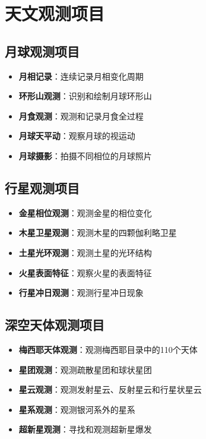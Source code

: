\documentclass[12pt,UTF8]{ctexbook}
\begin{document}
\chapter{天文观测项目}
\section{月球观测项目}

\begin{itemize}
  \item \textbf{月相记录}：连续记录月相变化周期
  \item \textbf{环形山观测}：识别和绘制月球环形山
  \item \textbf{月食观测}：观测和记录月食全过程
  \item \textbf{月球天平动}：观察月球的视运动
  \item \textbf{月球摄影}：拍摄不同相位的月球照片
\end{itemize}

\section{行星观测项目}

\begin{itemize}
  \item \textbf{金星相位观测}：观测金星的相位变化
  \item \textbf{木星卫星观测}：观测木星的四颗伽利略卫星
  \item \textbf{土星光环观测}：观测土星的光环结构
  \item \textbf{火星表面特征}：观察火星的表面特征
  \item \textbf{行星冲日观测}：观测行星冲日现象
\end{itemize}

\section{深空天体观测项目}

\begin{itemize}
  \item \textbf{梅西耶天体观测}：观测梅西耶目录中的110个天体
  \item \textbf{星团观测}：观测疏散星团和球状星团
  \item \textbf{星云观测}：观测发射星云、反射星云和行星状星云
  \item \textbf{星系观测}：观测银河系外的星系
  \item \textbf{超新星观测}：寻找和观测超新星爆发
\end{itemize}
\end{document}

